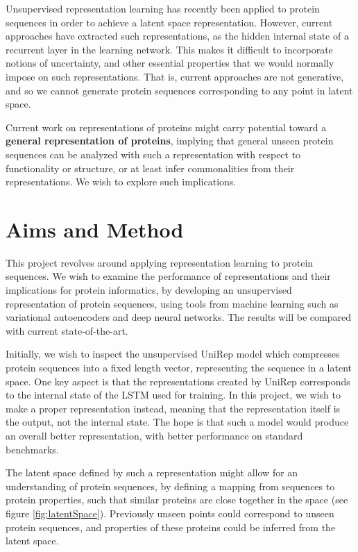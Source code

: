 Unsupervised representation learning has recently been applied to protein sequences \cite{alley2019unified} in order to achieve a latent space representation. However, current approaches have extracted such representations, as the hidden internal state of a recurrent layer in the learning network. This makes it difficult to incorporate notions of uncertainty, and other essential properties that we would normally impose on such representations. That is, current approaches are not generative, and so we cannot generate protein sequences corresponding to any point in latent space.

Current work on representations of proteins might carry potential toward a \textbf{general representation of proteins}, implying that general unseen protein sequences can be analyzed with such a representation with respect to functionality or structure, or at least infer commonalities from their representations. We wish to explore such implications.

\section*{Aims and Method}
This project revolves around applying representation learning to protein sequences. We wish to examine the performance of representations and their implications for protein informatics, by developing an unsupervised representation of protein sequences, using tools from machine learning such as variational autoencoders and deep neural networks. The results will be compared with current state-of-the-art.

Initially, we wish to inspect the unsupervised UniRep model \cite{alley2019unified} which compresses protein sequences into a fixed length vector, representing the sequence in a latent space. One key aspect is that the representations created by UniRep corresponds to the internal state of the LSTM used for training. In this project, we wish to make a proper representation instead, meaning that the representation itself is the output, not the internal state. The hope is that such a model would produce an overall better representation, with better performance on standard benchmarks.

The latent space defined by such a representation might allow for an understanding of protein sequences, by defining a mapping from sequences to protein properties, such that similar proteins are close together in the space (see figure \ref{fig:latentSpace}). Previously unseen points could correspond to unseen protein sequences, and properties of these proteins could be inferred from the latent space.


